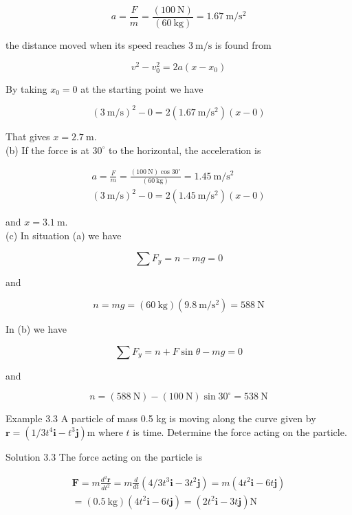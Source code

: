 \documentclass[10pt]{article}
\begin{document}
$$
a=\frac{F}{m}=\frac{(100 \mathrm{~N})}{(60 \mathrm{~kg})}=1.67 \mathrm{~m} / \mathrm{s}^{2}
$$

the distance moved when its speed reaches $3 \mathrm{~m} / \mathrm{s}$ is found from

$$
v^{2}-v_{0}^{2}=2 a\left(x-x_{0}\right)
$$

By taking $x_{0}=0$ at the starting point we have

$$
(3 \mathrm{~m} / \mathrm{s})^{2}-0=2\left(1.67 \mathrm{~m} / \mathrm{s}^{2}\right)(x-0)
$$

That gives $x=2.7 \mathrm{~m}$.\\
(b) If the force is at $30^{\circ}$ to the horizontal, the acceleration is

$$
\begin{gathered}
a=\frac{F}{m}=\frac{(100 \mathrm{~N}) \cos 30^{\circ}}{(60 \mathrm{~kg})}=1.45 \mathrm{~m} / \mathrm{s}^{2} \\
(3 \mathrm{~m} / \mathrm{s})^{2}-0=2\left(1.45 \mathrm{~m} / \mathrm{s}^{2}\right)(x-0)
\end{gathered}
$$

and $x=3.1 \mathrm{~m}$.\\
(c) In situation (a) we have

$$
\sum F_{y}=n-m g=0
$$

and

$$
n=m g=(60 \mathrm{~kg})\left(9.8 \mathrm{~m} / \mathrm{s}^{2}\right)=588 \mathrm{~N}
$$

In (b) we have

$$
\sum F_{y}=n+F \sin \theta-m g=0
$$

and

$$
n=(588 \mathrm{~N})-(100 \mathrm{~N}) \sin 30^{\circ}=538 \mathrm{~N}
$$

Example 3.3 A particle of mass 0.5 kg is moving along the curve given by $\mathbf{r}=\left(1 / 3 t^{4} \mathbf{i}-t^{3} \mathbf{j}\right) \mathrm{m}$ where $t$ is time. Determine the force acting on the particle.

Solution 3.3 The force acting on the particle is

$$
\begin{gathered}
\mathbf{F}=m \frac{d^{2} \mathbf{r}}{d t^{2}}=m \frac{d}{d t}\left(4 / 3 t^{3} \mathbf{i}-3 t^{2} \mathbf{j}\right)=m\left(4 t^{2} \mathbf{i}-6 t \mathbf{j}\right) \\
=(0.5 \mathrm{~kg})\left(4 t^{2} \mathbf{i}-6 t \mathbf{j}\right)=\left(2 t^{2} \mathbf{i}-3 t \mathbf{j}\right) \mathrm{N}
\end{gathered}
$$
\end{document}
